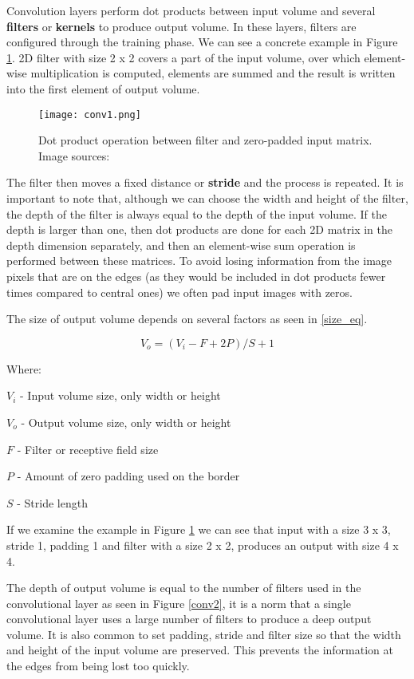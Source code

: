 Convolution layers perform dot products between input volume and several \textbf{filters} or \textbf{kernels} to produce output volume.
In these layers, filters are configured through the training phase.
We can see a concrete example in Figure \ref{conv1}.
2D filter with size 2 x 2 covers a part of the input volume, over which element-wise multiplication is computed, elements are summed and the result is written into the first element of output volume.

\begin{figure}[ht] 
    \centering
    \texttt{[image: conv1.png]} 
\caption[Dot product operation between filter and zero-padded input matrix.] {Dot product operation between filter and zero-padded input matrix. Image sources: \cite{conv_layer_img}}
    \label{conv1}
\end{figure}

The filter then moves a fixed distance or \textbf{stride} and the process is repeated.
It is important to note that, although we can choose the width and height of the filter, the depth of the filter is always equal to the depth of the input volume.
If the depth is larger than one, then dot products are done for each 2D matrix in the depth dimension separately, and then an element-wise sum operation is performed between these matrices.
To avoid losing information from the image pixels that are on the edges (as they would be included in dot products fewer times compared to central ones) we often pad input images with zeros.

The size of output volume depends on several factors as seen in \ref{size_eq}.

\begin{equation}\label{size_eq}
V_{o} = (V_{i} - F + 2P) / S + 1
\end{equation}

Where:

$V_{i}$ - Input volume size, only width or height

$V_{o}$ - Output volume size, only width or height

$F$ - Filter or receptive field size

$P$ - Amount of zero padding used on the border

$S$ - Stride length

If we examine the example in Figure \ref{conv1} we can see that input with a size 3 x 3, stride 1, padding 1 and filter with a size 2 x 2, produces an output with size 4 x 4.

The depth of output volume is equal to the number of filters used in the convolutional layer as seen in Figure \ref{conv2}, it is a norm that a single convolutional layer uses a large number of filters to produce a deep output volume\cite{cs231n}.
It is also common to set padding, stride and filter size so that the width and height of the input volume are preserved.
This prevents the information at the edges from being lost too quickly\cite{cs231n}.


